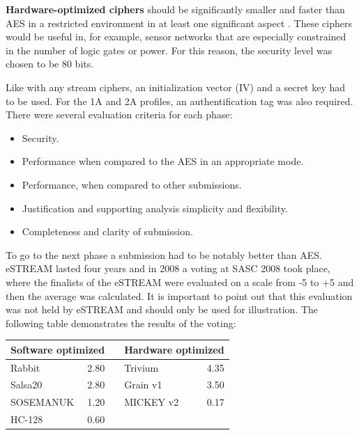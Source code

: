 \vspace{0.3cm}

\textbf{Hardware-optimized ciphers} should be significantly smaller and faster  than AES in a restricted environment in at least one significant aspect \cite{good2008asic}. These ciphers would be useful in, for example, sensor networks that are especially constrained in the number of logic gates or power. For this reason, the security level was chosen to be 80 bits.

Like with any stream ciphers, an initialization vector (IV) and a secret key had to be used. For the 1A and 2A profiles, an authentification tag was also required.\\
There were several evaluation criteria for each phase:
\begin{itemize}
	\setlength\itemsep{0.1em}
	\item Security.
	\item Performance when compared to the AES in an appropriate mode.
	\item Performance, when compared to other submissions.
	\item Justification and supporting analysis simplicity and flexibility.
	\item Completeness and clarity of submission.
\end{itemize}

\vspace{0.3cm}

To go to the next phase a submission had to be notably better than AES.\\
eSTREAM lasted four years and in 2008 a voting at SASC 2008 took place, where the finalists of the eSTREAM were evaluated on a scale from -5 to +5 and then the average was calculated. It is important to point out that this evaluation was not held by eSTREAM and should only be used for illustration. The following table demonstrates the results of the voting:

\bgroup
\def\arraystretch{1.2}%
\begin{table}[h!]
	\centering
	\begin{tabular}{|l r |c| l r|} 
		\hline 
		\multicolumn{2}{|c|}{Software optimized} && \multicolumn{2}{c|}{Hardware optimized} \\
		\hline 
		Rabbit & 2.80 & & Trivium & 4.35\\ 
		Salsa20 & 2.80 & & Grain v1 & 3.50\\
		SOSEMANUK & 1.20 & & MICKEY v2& 0.17\\
		HC-128 & 0.60 & & & \\
		\hline
	\end{tabular}
	\label{table:eStream portfolio with SASC2008 evaluation}
\end{table}
\egroup

